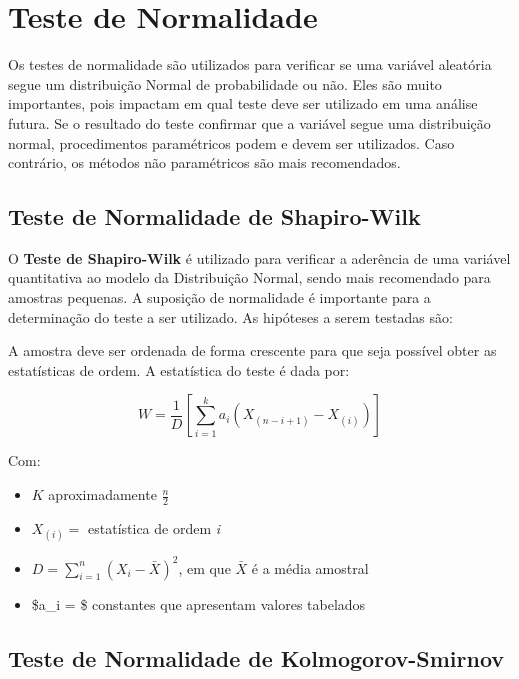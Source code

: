 \documentclass[
]{estat/estat}
\begin{document}
\section{Teste de Normalidade}\label{teste-de-normalidade}

Os testes de normalidade são utilizados para verificar se uma variável
aleatória segue um distribuição Normal de probabilidade ou não. Eles são
muito importantes, pois impactam em qual teste deve ser utilizado em uma
análise futura. Se o resultado do teste confirmar que a variável segue
uma distribuição normal, procedimentos paramétricos podem e devem ser
utilizados. Caso contrário, os métodos não paramétricos são mais
recomendados.

\subsection{Teste de Normalidade de
Shapiro-Wilk}\label{teste-de-normalidade-de-shapiro-wilk}

O \textbf{Teste de Shapiro-Wilk} é utilizado para verificar a aderência
de uma variável quantitativa ao modelo da Distribuição Normal, sendo
mais recomendado para amostras pequenas. A suposição de normalidade é
importante para a determinação do teste a ser utilizado. As hipóteses a
serem testadas são:


A amostra deve ser ordenada de forma crescente para que seja possível
obter as estatísticas de ordem. A estatística do teste é dada por:

\[ W = \frac{1}{D} \left[ \sum_{i=1}^{k} a_{i} \left(X_{(n-i+1)} - X_{(i)}\right) \right] \]

Com:

\begin{itemize}
\item
  \(K\) aproximadamente \(\displaystyle\frac{n}{2}\)
\item
  \(X_{\left(i\right)} =\) estatística de ordem \emph{i}
\item
  \(D = \displaystyle \sum_{i=1}^{n}(X_{i} - \bar{X})^2\), em que
  \(\bar{X}\) é a média amostral
\item
  \$a\_i = \$ constantes que apresentam valores tabelados
\end{itemize}

\subsection{Teste de Normalidade de
Kolmogorov-Smirnov}\label{teste-de-normalidade-de-kolmogorov-smirnov}
\end{document}
